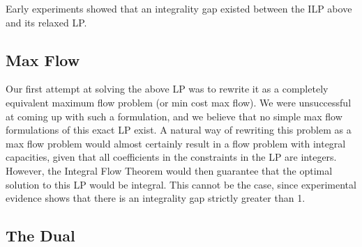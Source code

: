 \documentclass[11pt]{article}
\begin{document}
Early experiments showed that an integrality gap existed between the ILP above and its relaxed LP.

\subsection{Max Flow}

Our first attempt at solving the above LP was to rewrite it as a completely equivalent maximum flow problem (or min cost max flow). We were unsuccessful at coming up with such a formulation, and we believe that no simple max flow formulations of this exact LP exist. A natural way of rewriting this problem as a max flow problem would almost certainly result in a flow problem with integral capacities, given that all coefficients in the constraints in the LP are integers. However, the Integral Flow Theorem would then guarantee that the optimal solution to this LP would be integral. This cannot be the case, since experimental evidence shows that there is an integrality gap strictly greater than 1.

\subsection{The Dual}
\end{document}
